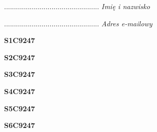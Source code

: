 \begin{turn}{90}\begin{minipage}{\linewidth} \vspace{20mm} ................................................  \textit{Imię i nazwisko}\end{minipage}\end{turn}

\begin{turn}{90}\begin{minipage}{\linewidth} \vspace{20mm} ................................................  \textit{Adres e-mailowy}\end{minipage}\end{turn}

\begin{turn}{90}\huge \begin{minipage}{\linewidth} \vspace{10mm}\textbf{S1C9247}\end{minipage}\end{turn}

\begin{turn}{90}\huge \begin{minipage}{\linewidth} \vspace{10mm}\textbf{S2C9247}\end{minipage}\end{turn}

\begin{turn}{90}\huge \begin{minipage}{\linewidth} \vspace{10mm}\textbf{S3C9247}\end{minipage}\end{turn}

\begin{turn}{90}\huge \begin{minipage}{\linewidth} \vspace{10mm}\textbf{S4C9247}\end{minipage}\end{turn}

\begin{turn}{90}\huge \begin{minipage}{\linewidth} \vspace{10mm}\textbf{S5C9247}\end{minipage}\end{turn}

\begin{turn}{90}\huge \begin{minipage}{\linewidth} \vspace{10mm}\textbf{S6C9247}\end{minipage}\end{turn}

